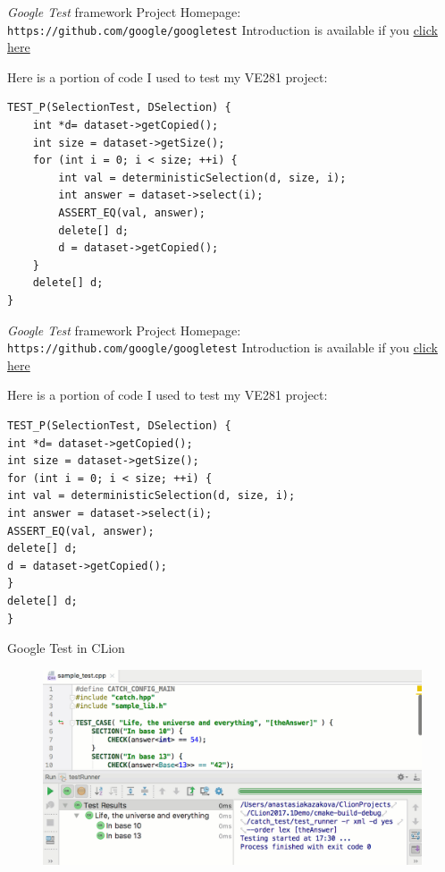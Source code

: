 \begin{frame}[fragile]{\textit{Google Test} framework}
Project Homepage: \texttt{https://github.com/google/googletest}
Introduction is available if you  \hyperlink{https://github.com/google/googletest/blob/master/googletest/docs/Primer.md}{click here}

Here is a portion of code I used to test my VE281 project:
\begin{verbatim}
TEST_P(SelectionTest, DSelection) {
    int *d= dataset->getCopied();
    int size = dataset->getSize();
    for (int i = 0; i < size; ++i) {
        int val = deterministicSelection(d, size, i);
        int answer = dataset->select(i);
        ASSERT_EQ(val, answer);
        delete[] d;
        d = dataset->getCopied();
    }
    delete[] d;
}
\end{verbatim}
\end{frame}

\begin{frame}[fragile]{\textit{Google Test} framework}
Project Homepage: \texttt{https://github.com/google/googletest}
Introduction is available if you  \hyperlink{https://github.com/google/googletest/blob/master/googletest/docs/Primer.md}{click here}

Here is a portion of code I used to test my VE281 project:
\begin{verbatim}
TEST_P(SelectionTest, DSelection) {
int *d= dataset->getCopied();
int size = dataset->getSize();
for (int i = 0; i < size; ++i) {
int val = deterministicSelection(d, size, i);
int answer = dataset->select(i);
ASSERT_EQ(val, answer);
delete[] d;
d = dataset->getCopied();
}
delete[] d;
}
\end{verbatim}
\end{frame}

\begin{frame}{Google Test in CLion}
\vspace{-0.2in}

\begin{figure}
	\centering
	\includegraphics[scale=0.25]{fig/rc6gtest}
\end{figure}
\end{frame}


